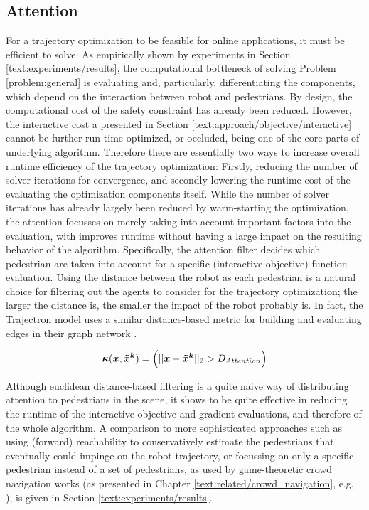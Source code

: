 \subsection{Attention}
\label{text:approach/runtime/filtering}
For a trajectory optimization to be feasible for online applications, it must be efficient to solve. As empirically shown by experiments in Section \ref{text:experiments/results}, the computational bottleneck of solving Problem \ref{problem:general} is evaluating and, particularly, differentiating the components, which depend on the interaction between robot and pedestrians. By design, the computational cost of the safety constraint has already been reduced. However, the interactive cost a presented in Section \ref{text:approach/objective/interactive} cannot be further run-time optimized, or occluded, being one of the core parts of underlying algorithm. Therefore there are essentially two ways to increase overall runtime efficiency of the trajectory optimization: Firstly, reducing the number of solver iterations for convergence, and secondly lowering the runtime cost of the evaluating the optimization components itself. 
\newline
While the number of solver iterations has already largely been reduced by warm-starting the optimization, the attention focusses on merely taking into account important factors into the evaluation, with improves runtime without having a large impact on the resulting behavior of the algorithm. Specifically, the attention filter decides which pedestrian are taken into account for a specific (interactive objective) function evaluation. 
\newline
Using the distance between the robot as each pedestrian is a natural choice for filtering out the agents to consider for the trajectory optimization; the larger the distance is, the smaller the impact of the robot probably is. In fact, the Trajectron model uses a similar distance-based metric for building and evaluating edges in their graph network \cite{Salzmann2020}. 

\begin{equation}
\attention(\x, \xped[k]) = \left( ||\x - \xped[k]||_2 > D_{Attention} \right)
\end{equation}

Although euclidean distance-based filtering is a quite naive way of distributing attention to pedestrians in the scene, it shows to be quite effective in reducing the runtime of the interactive objective and gradient evaluations, and therefore of the whole algorithm. A comparison to more sophisticated approaches such as using (forward) reachability to conservatively estimate the pedestrians that eventually could impinge on the robot trajectory, or focussing on only a specific pedestrian instead of a set of pedestrians, as used by game-theoretic crowd navigation works (as presented in Chapter \ref{text:related/crowd_navigation}, e.g.\, \cite{Bouzat2014}\cite{Nikolaidis2017}), is given in Section \ref{text:experiments/results}.